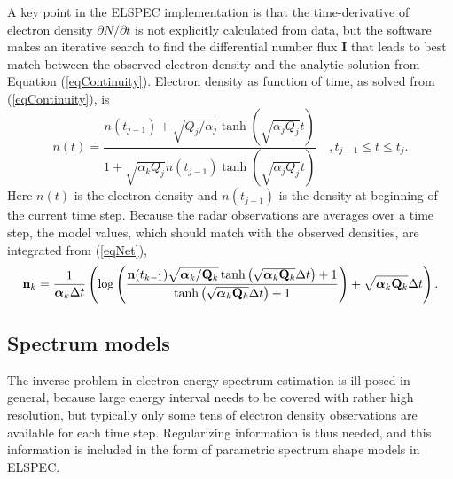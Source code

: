 \documentclass[12pt,a4paper]{report}
\begin{document}
A key point in the ELSPEC implementation is that the time-derivative of electron density $\partial N / \partial t$ is not explicitly calculated from data, but the software makes an iterative search to find the differential number flux $\bm{I}$ that leads to best match between the observed electron density and the analytic solution from Equation (\ref{eqContinuity}). Electron density as function of time, as solved from (\ref{eqContinuity}), is
\begin{equation}
n(t) = \frac{ n(t_{j-1}) + \sqrt{Q_j/ \alpha_j}\tanh\left(\sqrt{\alpha_j Q_j} t\right) }{ 1 + \sqrt{\alpha_kQ_j}n(t_{j-1})\tanh\left(\sqrt{\alpha_j Q_j} t\right)} \quad, t_{j-1}\leq t \leq t_{j}.
\label{eqNet}
\end{equation}
Here $n(t)$ is the electron density and $n(t_{j-1})$ is the density at beginning of the current time step. Because the radar observations are averages over a time step, the model values, which should match with the observed densities, are integrated from (\ref{eqNet}),
\begin{equation}
\mathbf{n}_k=
\frac{1}{\mbox{\boldmath{$\alpha$}}_k \Delta t}
\left(
\log\left(
\frac{\mathbf{n}(t_{k-1})\sqrt{\mbox{\boldmath{$\alpha$}}_k/\mathbf{Q}_k}\tanh\left(\sqrt{\mbox{\boldmath{$\alpha$}}_k\mathbf{Q}_k}\Delta t\right)+1}{\tanh\left(\sqrt{\mbox{\boldmath{$\alpha$}}_k\mathbf{Q}_k}\Delta t\right) + 1}
\right)
+\sqrt{\mbox{\boldmath{$\alpha$}}_k\mathbf{Q}_k}\Delta t
\right).
\label{eqDirthe}
\end{equation}


\subsection{Spectrum models}

The inverse problem in electron energy spectrum estimation is ill-posed in general, because large energy interval needs to be covered with rather high resolution, but typically only some tens of electron density observations are available for each time step. Regularizing information is thus needed, and this information is included in the form of parametric spectrum shape models in ELSPEC. 
\end{document}

